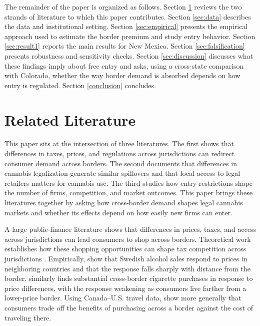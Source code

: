 \documentclass[12pt]{article}
\begin{document}
The remainder of the paper is organized as follows. Section \ref{litreview} reviews the two strands of literature to which this paper contributes. Section \ref{sec:data} describes the data and institutional setting. Section \ref{sec:empirical} presents the empirical approach used to estimate the border premium and study entry behavior. Section \ref{sec:result1} reports the main results for New Mexico. Section \ref{sec:falsification} presents robustness and sensitivity checks. Section \ref{sec:discussion} discusses what these findings imply about free entry and asks, using a cross-state comparison with Colorado, whether the way border demand is absorbed depends on how entry is regulated. Section \ref{conclusion} concludes.

\section{Related Literature}
\label{litreview}

This paper sits at the intersection of three literatures. The first shows that differences in taxes, prices, and regulations across jurisdictions can redirect consumer demand across borders. The second documents that differences in cannabis legalization generate similar spillovers and that local access to legal retailers matters for cannabis use. The third studies how entry restrictions shape the number of firms, competition, and market outcomes. This paper brings these literatures together by asking how cross-border demand shapes legal cannabis markets and whether its effects depend on how easily new firms can enter.


A large public-finance literature shows that differences in prices, taxes, and access across jurisdictions can lead consumers to shop across borders.
Theoretical work establishes how these shopping opportunities can shape tax competition across jurisdictions \cite{KanburKeen1993}. Empirically, \cite{AsplundFribergWilander2007} show that Swedish alcohol sales respond to prices in neighboring countries and that the response falls sharply with distance from the border. \cite{Lovenheim2008} similarly finds substantial cross-border cigarette purchases in response to price differences, with the response weakening as consumers live farther from a lower-price border. Using Canada--U.S. travel data, \cite{ChandraHeadTappata2014} show more generally that consumers trade off the benefits of purchasing across a border against the cost of traveling there.
\end{document}
